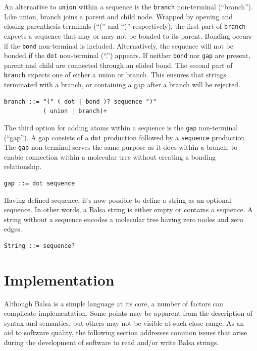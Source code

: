 \documentclass{article}
\def\ttt{\texttt}
\begin{document}
An alternative to \ttt{union} within a sequence is the \ttt{branch} non-terminal (\enquote{branch}). Like union, branch joins a parent and child node. Wrapped by opening and closing parenthesis terminals (\enquote{(} and \enquote{)} respectively), the first part of \ttt{branch} expects a sequence that may or may not be bonded to its parent. Bonding occurs if the \ttt{bond} non-terminal is included. Alternatively, the sequence will not be bonded if the \ttt{dot} non-terminal (\enquote{.}) appears. If neither \ttt{bond} nor \ttt{gap} are present, parent and child are connected through an elided bond. The second part of \ttt{branch} expects one of either a union or branch. This ensures that strings terminated with a branch, or containing a gap after a branch will be rejected.

\begin{lstlisting}
branch ::= "(" ( dot | bond )? sequence ")"
           ( union | branch)+
\end{lstlisting}

The third option for adding atoms within a sequence is the \ttt{gap} non-terminal (\enquote{gap}). A gap consists of a \ttt{dot} production followed by a \ttt{sequence} production. The \ttt{gap} non-terminal serves the same purpose as it does within a branch: to enable connection within a molecular tree without creating a bonding relationship.

\begin{lstlisting}
gap ::= dot sequence
\end{lstlisting}

Having defined sequence, it's now possible to define a string as an optional sequence. In other words, a Balsa string is either empty or contains a sequence. A string without a sequence encodes a molecular tree having zero nodes and zero edges.

\begin{lstlisting}
String ::= sequence?
\end{lstlisting}

\section*{Implementation}

Although Balsa is a simple language at its core, a number of factors can complicate implementation. Some points may be apparent from the description of syntax and semantics, but others may not be visible at such close range. As an aid to software quality, the following section addresses common issues that arise during the development of software to read and/or write Balsa strings.
\end{document}

